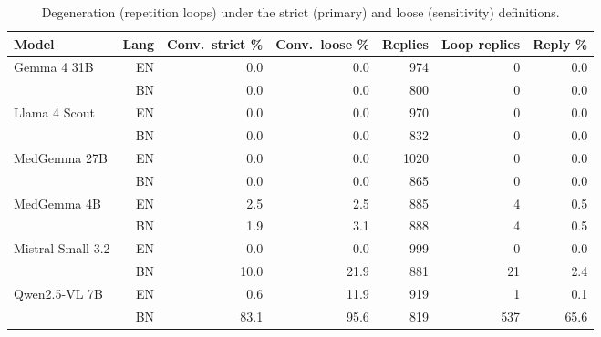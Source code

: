 \begin{table}[!htbp]
\centering
\scriptsize
\begin{tabular}{lrrrrrr}
\toprule
Model & Lang & Conv.\ strict \% & Conv.\ loose \% & Replies & Loop replies & Reply \% \\
\midrule
Gemma 4 31B & EN & 0.0 & 0.0 & 974 & 0 & 0.0 \\
 & BN & 0.0 & 0.0 & 800 & 0 & 0.0 \\
Llama 4 Scout & EN & 0.0 & 0.0 & 970 & 0 & 0.0 \\
 & BN & 0.0 & 0.0 & 832 & 0 & 0.0 \\
MedGemma 27B & EN & 0.0 & 0.0 & 1020 & 0 & 0.0 \\
 & BN & 0.0 & 0.0 & 865 & 0 & 0.0 \\
MedGemma 4B & EN & 2.5 & 2.5 & 885 & 4 & 0.5 \\
 & BN & 1.9 & 3.1 & 888 & 4 & 0.5 \\
Mistral Small 3.2 & EN & 0.0 & 0.0 & 999 & 0 & 0.0 \\
 & BN & 10.0 & 21.9 & 881 & 21 & 2.4 \\
Qwen2.5-VL 7B & EN & 0.6 & 11.9 & 919 & 1 & 0.1 \\
 & BN & 83.1 & 95.6 & 819 & 537 & 65.6 \\
\bottomrule
\end{tabular}
\caption{Degeneration (repetition loops) under the strict (primary) and loose (sensitivity) definitions.}
\label{tab:degen}
\end{table}
